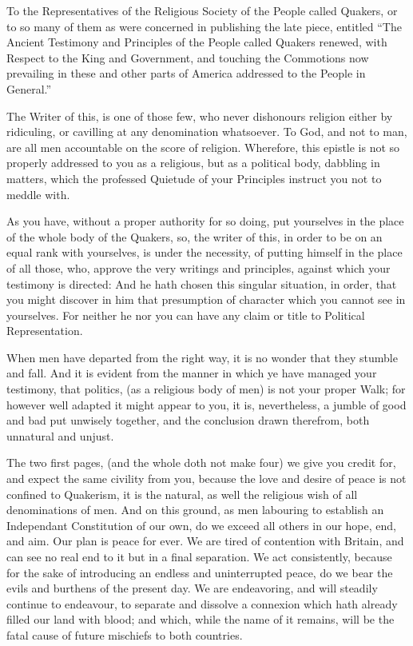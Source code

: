 \documentclass[12pt,oneside]{memoir}
\begin{document}
To the Representatives of the Religious Society of the People called
Quakers, or to so many of them as were concerned in publishing the
late piece, entitled ``The Ancient Testimony and Principles of the
People called Quakers renewed, with Respect to the King and
Government, and touching the Commotions now prevailing in these and
other parts of America addressed to the People in General.''

The Writer of this, is one of those few, who never dishonours
religion either by ridiculing, or cavilling at any denomination
whatsoever. To God, and not to man, are all men accountable on the
score of religion. Wherefore, this epistle is not so properly
addressed to you as a religious, but as a political body, dabbling
in matters, which the professed Quietude of your Principles instruct
you not to meddle with.

As you have, without a proper authority for so doing, put yourselves
in the place of the whole body of the Quakers, so, the writer of
this, in order to be on an equal rank with yourselves, is under the
necessity, of putting himself in the place of all those, who,
approve the very writings and principles, against which your
testimony is directed: And he hath chosen this singular situation,
in order, that you might discover in him that presumption of
character which you cannot see in yourselves. For neither he nor you
can have any claim or title to Political Representation.

When men have departed from the right way, it is no wonder that they
stumble and fall. And it is evident from the manner in which ye have
managed your testimony, that politics, (as a religious body of men)
is not your proper Walk; for however well adapted it might appear to
you, it is, nevertheless, a jumble of good and bad put unwisely
together, and the conclusion drawn therefrom, both unnatural and
unjust.

The two first pages, (and the whole doth not make four) we give you
credit for, and expect the same civility from you, because the love
and desire of peace is not confined to Quakerism, it is the natural,
as well the religious wish of all denominations of men. And on this
ground, as men labouring to establish an Independant Constitution of
our own, do we exceed all others in our hope, end, and aim. Our plan
is peace for ever. We are tired of contention with Britain, and can
see no real end to it but in a final separation. We act consistently,
because for the sake of introducing an endless and uninterrupted
peace, do we bear the evils and burthens of the present day. We are
endeavoring, and will steadily continue to endeavour, to separate
and dissolve a connexion which hath already filled our land with
blood; and which, while the name of it remains, will be the fatal
cause of future mischiefs to both countries.
\end{document}
